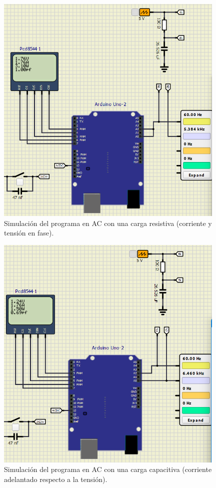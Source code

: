 \begin{figure}[h]
    \centering
    \includegraphics[width=11cm]{Imagenes/sim-resistive.png}
    \caption{Simulación del programa en AC con una carga resistiva (corriente y tensión en fase).}
    \label{sim-res}
\end{figure}

\begin{figure}[h]
    \centering
    \includegraphics[width=11cm]{Imagenes/sim-capacitive.png}
    \caption{Simulación del programa en AC con una carga capacitiva (corriente adelantado respecto a la tensión).}
    \label{sim-cap}
\end{figure}

